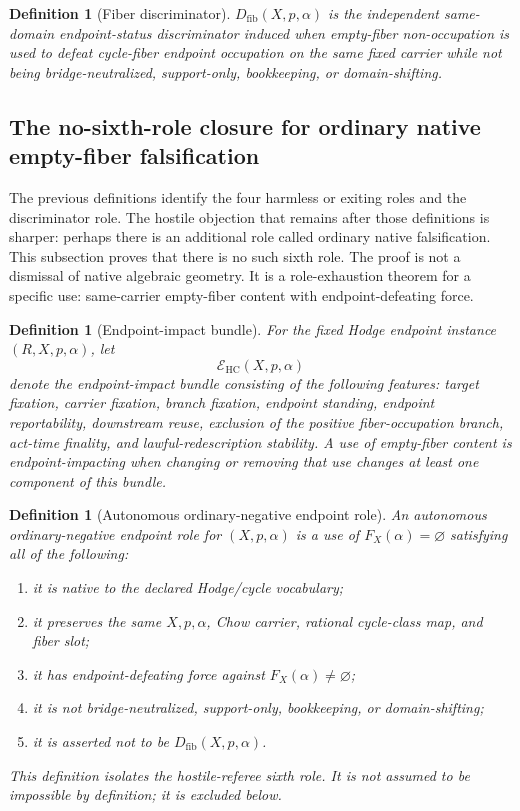 \documentclass[11pt]{article}
\newtheorem{definition}[theorem]{Definition}
\newcommand{\HC}{\operatorname{HC}}
\begin{document}
\begin{definition}[Fiber discriminator]
$D_{\mathrm{fib}}(X,p,\alpha)$ is the independent same-domain endpoint-status discriminator induced when empty-fiber non-occupation is used to defeat cycle-fiber endpoint occupation on the same fixed carrier while not being bridge-neutralized, support-only, bookkeeping, or domain-shifting.
\end{definition}


\subsection{The no-sixth-role closure for ordinary native empty-fiber falsification}

The previous definitions identify the four harmless or exiting roles and the discriminator role. The hostile objection that remains after those definitions is sharper: perhaps there is an additional role called ordinary native falsification. This subsection proves that there is no such sixth role. The proof is not a dismissal of native algebraic geometry. It is a role-exhaustion theorem for a specific use: same-carrier empty-fiber content with endpoint-defeating force.

\begin{definition}[Endpoint-impact bundle]
For the fixed Hodge endpoint instance $(R,X,p,\alpha)$, let
\[
\mathcal E_{\HC}(X,p,\alpha)
\]
denote the endpoint-impact bundle consisting of the following features: target fixation, carrier fixation, branch fixation, endpoint standing, endpoint reportability, downstream reuse, exclusion of the positive fiber-occupation branch, act-time finality, and lawful-redescription stability. A use of empty-fiber content is endpoint-impacting when changing or removing that use changes at least one component of this bundle.
\end{definition}

\begin{definition}[Autonomous ordinary-negative endpoint role]
An autonomous ordinary-negative endpoint role for $(X,p,\alpha)$ is a use of $F_X(\alpha)=\varnothing$ satisfying all of the following:
\begin{enumerate}
\item it is native to the declared Hodge/cycle vocabulary;
\item it preserves the same $X,p,\alpha$, Chow carrier, rational cycle-class map, and fiber slot;
\item it has endpoint-defeating force against $F_X(\alpha)\neq\varnothing$;
\item it is not bridge-neutralized, support-only, bookkeeping, or domain-shifting;
\item it is asserted not to be $D_{\mathrm{fib}}(X,p,\alpha)$.
\end{enumerate}
This definition isolates the hostile-referee sixth role. It is not assumed to be impossible by definition; it is excluded below.
\end{definition}
\end{document}
